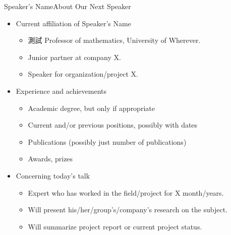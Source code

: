 \documentclass{beamer}
\begin{document}
\begin{frame}{Speaker's Name}{About Our Next Speaker}

  \begin{itemize}
  \item
    Current affiliation of Speaker's Name

    \begin{itemize}
    \item
      測試 Professor of mathematics, University of Wherever.
    \item
      Junior partner at company X.
    \item
      Speaker for organization/project X.
    \end{itemize}
  \item
    Experience and achievements

    \begin{itemize}
    \item
      Academic degree, but only if appropriate
    \item
      Current and/or previous positions, possibly with dates
    \item
      Publications (possibly just number of publications)
    \item
      Awards, prizes
    \end{itemize}
  \item
    Concerning today's talk

    \begin{itemize}
    \item
      Expert who has worked in the field/project for X month/years.
    \item
      Will present his/her/group's/company's research on the subject.
    \item
      Will summarize project report or current project status.
    \end{itemize}
  \end{itemize}  
\end{frame}
\end{document}
